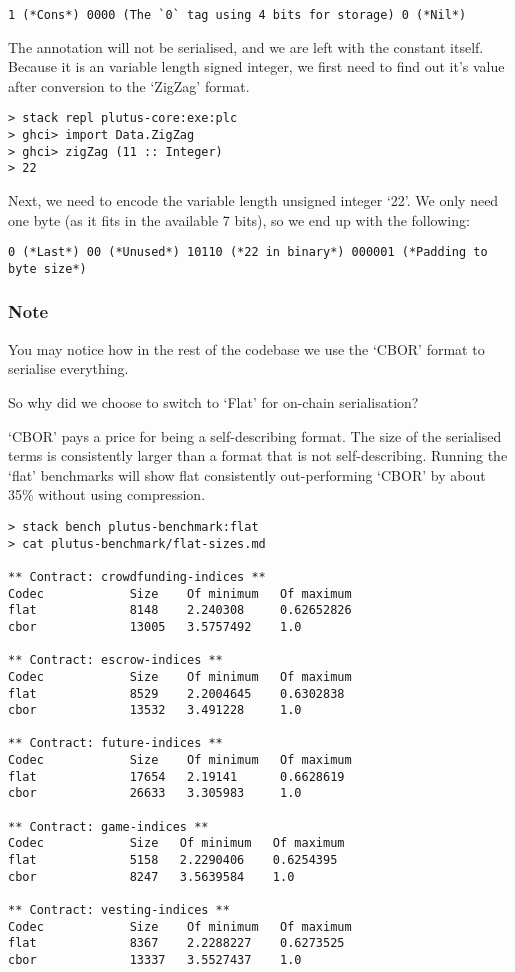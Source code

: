 \begin{verbatim}
1 (*Cons*) 0000 (The `0` tag using 4 bits for storage) 0 (*Nil*)
\end{verbatim}

The annotation will not be serialised, and we are left with the constant itself. Because it is an variable length signed integer, we first need to find out it's value after conversion to the `ZigZag' format.

\begin{verbatim}
> stack repl plutus-core:exe:plc
> ghci> import Data.ZigZag
> ghci> zigZag (11 :: Integer)
> 22
\end{verbatim}

Next, we need to encode the variable length unsigned integer `22'. We only need one byte (as it fits in the available 7 bits), so we end up with the following:

\begin{verbatim}
0 (*Last*) 00 (*Unused*) 10110 (*22 in binary*) 000001 (*Padding to byte size*)
\end{verbatim}

\subsubsection{Note}

You may notice how in the rest of the codebase we use the `CBOR' format to serialise
everything.

So why did we choose to switch to `Flat' for on-chain serialisation?

`CBOR' pays a price for being a self-describing format. The size of the serialised
terms is consistently larger than a format that is not self-describing. Running the
`flat' benchmarks will show flat consistently out-performing `CBOR' by about 35\%
without using compression.

\begin{verbatim}
> stack bench plutus-benchmark:flat
> cat plutus-benchmark/flat-sizes.md

** Contract: crowdfunding-indices **
Codec            Size    Of minimum   Of maximum
flat             8148    2.240308     0.62652826
cbor             13005   3.5757492    1.0

** Contract: escrow-indices **
Codec            Size    Of minimum   Of maximum
flat             8529    2.2004645    0.6302838 
cbor             13532   3.491228     1.0

** Contract: future-indices **
Codec            Size    Of minimum   Of maximum
flat             17654   2.19141      0.6628619 
cbor             26633   3.305983     1.0

** Contract: game-indices **
Codec            Size   Of minimum   Of maximum
flat             5158   2.2290406    0.6254395 
cbor             8247   3.5639584    1.0

** Contract: vesting-indices **
Codec            Size    Of minimum   Of maximum
flat             8367    2.2288227    0.6273525 
cbor             13337   3.5527437    1.0
\end{verbatim}
